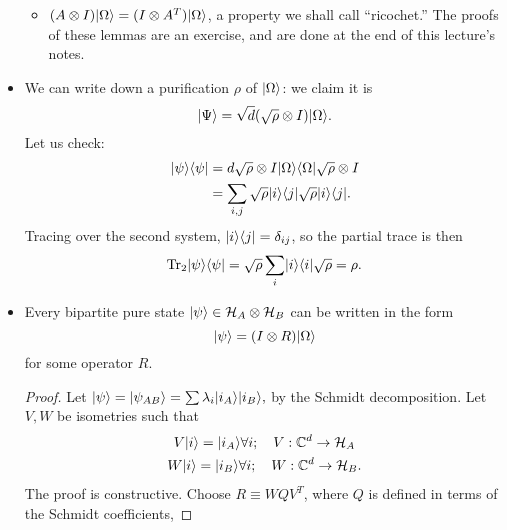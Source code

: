 \begin{itemize}
\begin{itemize}
        \item $(A\otimes I)\lvert\Omega\rangle=(I\otimes A^T)\lvert\Omega\rangle$, a property we shall call ``ricochet.'' The proofs of these lemmas are an exercise, and are done at the end of this lecture's notes.
    \end{itemize}
    \item We can write down a purification $\rho$ of $\lvert\Omega\rangle$: we claim it is
    \begin{equation}
        \lvert\Psi\rangle=\sqrt{d}(\sqrt{\rho}\otimes I) \lvert\Omega\rangle.
    \end{equation}
    Let us check:
    \begin{align*}
        \lvert\psi\rangle\langle\psi\rvert&=d\sqrt{\rho} \otimes I \lvert\Omega\rangle\langle\Omega\rvert \sqrt{\rho}\otimes I\\
            &= \sum_{i,j}\sqrt{\rho}\lvert i\rangle\langle j\rvert\sqrt{\rho} \lvert i\rangle\langle j\rvert.
    \end{align*}
    Tracing over the second system, $\lvert i\rangle\langle j\rvert=\delta_{ij}$, so the partial trace is then
    \begin{equation}
        \operatorname{Tr}_2 \lvert\psi\rangle\langle\psi\rvert = \sqrt{\rho} \sum_i \lvert i\rangle\langle i\rvert \sqrt{\rho} = \rho.
    \end{equation}
    \item Every bipartite pure state $\lvert\psi\rangle\in \mathcal H_A \otimes \mathcal H_B$ can be written in the form
    \begin{equation}\label{bipartitedecomp}
        \lvert\psi\rangle=(I\otimes R) \lvert\Omega\rangle
    \end{equation}
    for some operator $R$.
    \begin{proof}
        Let $\lvert\psi\rangle=\lvert\psi_{AB}\rangle=\sum \lambda_i \lvert i_A\rangle\lvert i_B\rangle,$ by the Schmidt decomposition. Let $V,W$ be isometries such that
        \begin{gather}
            V\lvert i\rangle=\lvert i_A\rangle\forall i ; \quad V:\mathbb{C}^d \to \mathcal H_A\\
            W\lvert i\rangle=\lvert i_B\rangle\forall i; \quad W:\mathbb{C}^d \to \mathcal H_B.
        \end{gather}
        The proof is constructive. Choose $R \equiv W Q V^T$, where $Q$ is defined in terms of the Schmidt coefficients,

\end{proof}
\end{itemize}
